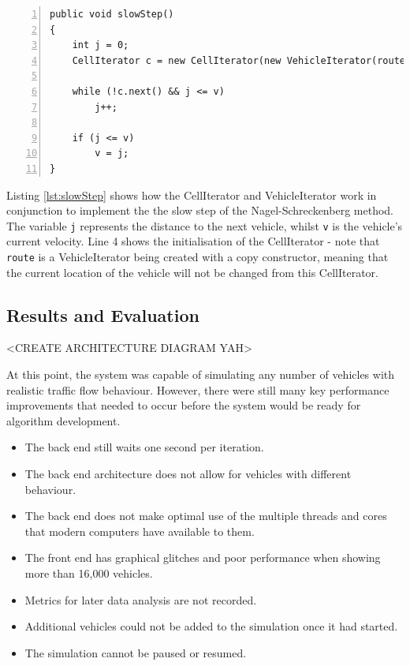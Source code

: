 \documentclass[ %
                    author={Alexander Hill},
                supervisor={Dr. Benjamin Sach},
                    degree={MEng},
                     title={MARMOSET},
                  subtitle={Multi-Agent Route Management using Online Simulation for Efficient Transportation},
                      type={research},
                      year={2016} ]{dissertation}
\begin{document}
\begin{minipage}{\linewidth}
\begin{lstlisting}[caption={The \texttt{slowStep} implementation making use of the CellIterator},
                    label=lst:slowStep, numbers=left]
public void slowStep()
{
    int j = 0;
    CellIterator c = new CellIterator(new VehicleIterator(route), cg, cellId);

    while (!c.next() && j <= v)
        j++;

    if (j <= v)
        v = j;
}
\end{lstlisting}
\end{minipage}

Listing \ref{lst:slowStep} shows how the CellIterator and VehicleIterator work
in conjunction to implement the the slow step of the Nagel-Schreckenberg method.
The variable \texttt{j} represents the distance to the next vehicle, whilst
\texttt{v} is the vehicle's current velocity. Line 4 shows the initialisation of
the CellIterator - note that \texttt{route} is a VehicleIterator being created
with a copy constructor, meaning that the current location of the vehicle will
not be changed from this CellIterator.

\subsection{Results and Evaluation}

<CREATE ARCHITECTURE DIAGRAM YAH>

At this point, the system was capable of simulating any number of vehicles with
realistic traffic flow behaviour. However, there were still many key performance
improvements that needed to occur before the system would be ready for
algorithm development.

\begin{itemize}
    \item The back end still waits one second per iteration.
    \item The back end architecture does not allow for vehicles with different
        behaviour.
    \item The back end does not make optimal use of the multiple threads and
        cores that modern computers have available to them.
    \item The front end has graphical glitches and poor performance when
        showing more than 16,000 vehicles.
    \item Metrics for later data analysis are not recorded.
    \item Additional vehicles could not be added to the simulation once it had
        started.
    \item The simulation cannot be paused or resumed.
\end{itemize}
\end{document}
